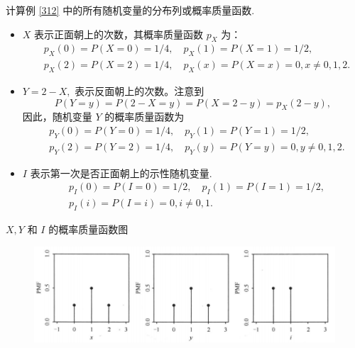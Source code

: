 \begin{frame}%
	\begin{exam}
		计算例 \ref{312} 中的所有随机变量的分布列或概率质量函数. %
		\begin{itemize}[<+-|alert@+>]
			\item  $X$ 表示正面朝上的次数，其概率质量函数 $p_X$ 为：
			      \begin{align*}
				       & p_X(0)=P(X=0)=1/4,\quad p_X(1)=P(X=1)=1/2,             \\
				       & p_X(2)=P(X=2)=1/4,\quad p_X(x)=P(X=x)=0, x\neq 0,1,2.
			      \end{align*}
			\item $Y=2-X,$ 表示反面朝上的次数。注意到 %
			      $$P(Y=y)=P(2-X=y)=P(X=2-y)=p_X(2-y),$$\pause
			      因此，随机变量 $Y$ 的概率质量函数为
			      \begin{align*}
				       & p_Y(0)=P(Y=0)=1/4,\quad p_Y(1)=P(Y=1)=1/2,             \\
				       & p_Y(2)=P(Y=2)=1/4,\quad p_Y(y)=P(Y=y)=0, y\neq 0,1,2.
			      \end{align*}
			\item $I$ 表示第一次是否正面朝上的示性随机变量.
			      \begin{align*}
				       & p_I(0)=P(I=0)=1/2,\quad p_I(1)=P(I=1)=1/2, \\
				       & p_I(i)=P(I=i)=0, i\neq 0,1.
			      \end{align*}

		\end{itemize}
	\end{exam}
\end{frame}

\begin{frame}{$X,Y$ 和 $I$ 的概率质量函数图}

	\begin{figure}[图 3.3.png]
		\centering
		\includegraphics[width=12cm]{figures/Fig3.3.png}
	\end{figure}
\end{frame}

